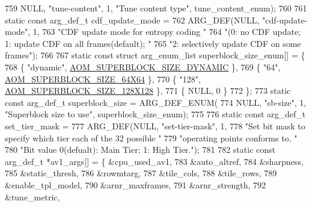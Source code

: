 \begin{DoxyCodeInclude}
{{{{{{{759     NULL, \textcolor{stringliteral}{"tune-content"}, 1, \textcolor{stringliteral}{"Tune content type"}, tune\_content\_enum);
760 
761 \textcolor{keyword}{static} \textcolor{keyword}{const} arg\_def\_t cdf\_update\_mode =
762     ARG\_DEF(NULL, \textcolor{stringliteral}{"cdf-update-mode"}, 1,
763             \textcolor{stringliteral}{"CDF update mode for entropy coding "}
764             \textcolor{stringliteral}{"(0: no CDF update; 1: update CDF on all frames(default); "}
765             \textcolor{stringliteral}{"2: selectively update CDF on some frames"});
766 
767 \textcolor{keyword}{static} \textcolor{keyword}{const} \textcolor{keyword}{struct }arg\_enum\_list superblock\_size\_enum[] = \{
768   \{ \textcolor{stringliteral}{"dynamic"}, \hyperlink{group__codec_ggac34a24f7c6c0fef7518aed0da4425f61aaabb4d9ad771b2fa177ff6fb5437b179}{AOM\_SUPERBLOCK\_SIZE\_DYNAMIC} \},
769   \{ \textcolor{stringliteral}{"64"}, \hyperlink{group__codec_ggac34a24f7c6c0fef7518aed0da4425f61a5abd24080a18d4f7e33217d93a73e968}{AOM\_SUPERBLOCK\_SIZE\_64X64} \},
770   \{ \textcolor{stringliteral}{"128"}, \hyperlink{group__codec_ggac34a24f7c6c0fef7518aed0da4425f61a17127133dafcd42b1d792770981d67d0}{AOM\_SUPERBLOCK\_SIZE\_128X128} \},
771   \{ NULL, 0 \}
772 \};
773 \textcolor{keyword}{static} \textcolor{keyword}{const} arg\_def\_t superblock\_size = ARG\_DEF\_ENUM(
774     NULL, \textcolor{stringliteral}{"sb-size"}, 1, \textcolor{stringliteral}{"Superblock size to use"}, superblock\_size\_enum);
775 
776 \textcolor{keyword}{static} \textcolor{keyword}{const} arg\_def\_t set\_tier\_mask =
777     ARG\_DEF(NULL, \textcolor{stringliteral}{"set-tier-mask"}, 1,
778             \textcolor{stringliteral}{"Set bit mask to specify which tier each of the 32 possible "}
779             \textcolor{stringliteral}{"operating points conforms to. "}
780             \textcolor{stringliteral}{"Bit value 0(defualt): Main Tier; 1: High Tier."});
781 
782 \textcolor{keyword}{static} \textcolor{keyword}{const} arg\_def\_t *av1\_args[] = \{ &cpu\_used\_av1,
783                                        &auto\_altref,
784                                        &sharpness,
785                                        &static\_thresh,
786                                        &rowmtarg,
787                                        &tile\_cols,
788                                        &tile\_rows,
789                                        &enable\_tpl\_model,
790                                        &arnr\_maxframes,
791                                        &arnr\_strength,
792                                        &tune\_metric,
}}}}}}}
\end{DoxyCodeInclude}
